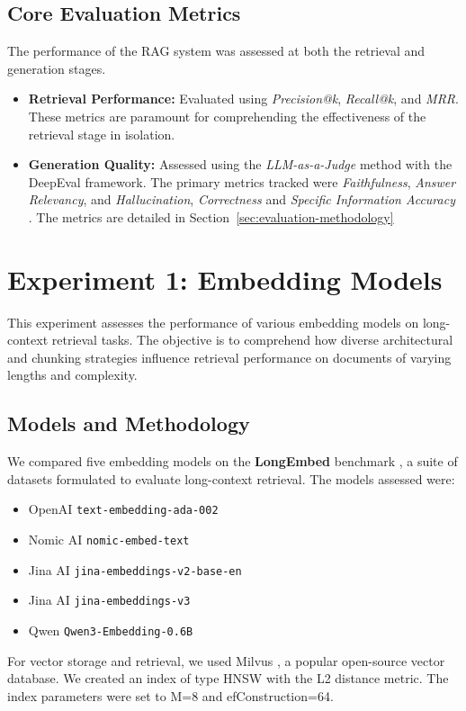 \subsection{Core Evaluation Metrics}
The performance of the RAG system was assessed at both the retrieval and generation stages.
\begin{itemize}
\item \textbf{Retrieval Performance:} Evaluated using \textit{Precision@k}, \textit{Recall@k}, and \textit{MRR}. These metrics are paramount for comprehending the effectiveness of the retrieval stage in isolation.
\item \textbf{Generation Quality:} Assessed using the \textit{LLM-as-a-Judge} method with the DeepEval framework. The primary metrics tracked were \textit{Faithfulness}, \textit{Answer Relevancy}, and \textit{Hallucination}, \textit{Correctness} and \textit{Specific Information Accuracy} \autocite{zheng2023judgingllmasajudgemtbenchchatbot}. The metrics are detailed in Section~\ref{sec:evaluation-methodology}
\end{itemize}

\section{Experiment 1: Embedding Models}
\label{sec:exp_embedding_models}
This experiment assesses the performance of various embedding models on long-context retrieval tasks. The objective is to comprehend how diverse architectural and chunking strategies influence retrieval performance on documents of varying lengths and complexity.

\subsection{Models and Methodology}
We compared five embedding models on the \textbf{LongEmbed} benchmark \autocite{zhu2024longembedextendingembeddingmodels}, a suite of datasets formulated to evaluate long-context retrieval. The models assessed were:
\begin{itemize}
    \item OpenAI \texttt{text-embedding-ada-002}
    \item Nomic AI \texttt{nomic-embed-text}
    \item Jina AI \texttt{jina-embeddings-v2-base-en}
    \item Jina AI \texttt{jina-embeddings-v3}
    \item Qwen \texttt{Qwen3-Embedding-0.6B}
\end{itemize}
For vector storage and retrieval, we used Milvus \autocite{milvus}, a popular open-source vector database. We created an index of type HNSW with the L2 distance metric. The index parameters were set to M=8 and efConstruction=64.


